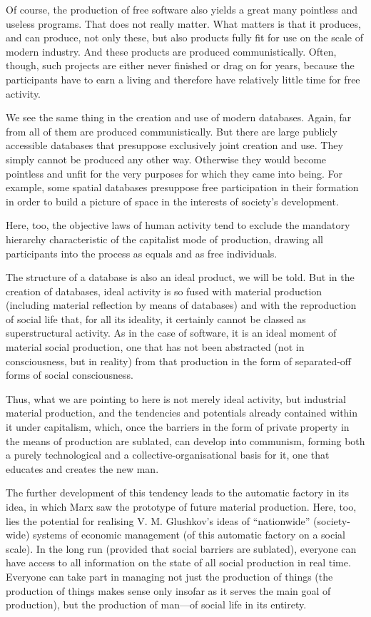 \documentclass[12pt,a4paper,openany]{book}
\begin{document}
Of course, the production of free software also yields a great many pointless and useless programs. That does not really matter. What matters is that it produces, and can produce, not only these, but also products fully fit for use on the scale of modern industry. And these products are produced communistically. Often, though, such projects are either never finished or drag on for years, because the participants have to earn a living and therefore have relatively little time for free activity.

We see the same thing in the creation and use of modern databases. Again, far from all of them are produced communistically. But there are large publicly accessible databases that presuppose exclusively joint creation and use. They simply cannot be produced any other way. Otherwise they would become pointless and unfit for the very purposes for which they came into being. For example, some spatial databases presuppose free participation in their formation in order to build a picture of space in the interests of society's development.

Here, too, the objective laws of human activity tend to exclude the mandatory hierarchy characteristic of the capitalist mode of production, drawing all participants into the process as equals and as free individuals.

The structure of a database is also an ideal product, we will be told. But in the creation of databases, ideal activity is so fused with material production (including material reflection by means of databases) and with the reproduction of social life that, for all its ideality, it certainly cannot be classed as superstructural activity. As in the case of software, it is an ideal moment of material social production, one that has not been abstracted (not in consciousness, but in reality) from that production in the form of separated-off forms of social consciousness.

Thus, what we are pointing to here is not merely ideal activity, but industrial material production, and the tendencies and potentials already contained within it under capitalism, which, once the barriers in the form of private property in the means of production are sublated, can develop into communism, forming both a purely technological and a collective-organisational basis for it, one that educates and creates the new man.

The further development of this tendency leads to the automatic factory in its idea, in which Marx saw the prototype of future material production. Here, too, lies the potential for realising V. M. Glushkov’s ideas of “nationwide” (society-wide) systems of economic management (of this automatic factory on a social scale). In the long run (provided that social barriers are sublated), everyone can have access to all information on the state of all social production in real time. Everyone can take part in managing not just the production of things (the production of things makes sense only insofar as it serves the main goal of production), but the production of man—of social life in its entirety.
\end{document}
